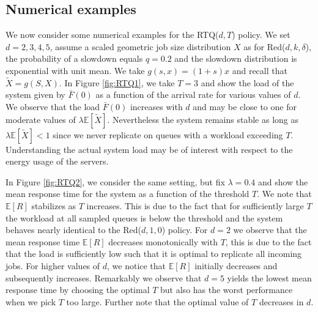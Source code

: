 \documentclass[12pt]{report}
\newcommand{\E}{\mathbb{E}}
\begin{document}
\subsection*{Numerical examples}

We now consider some numerical examples for the RTQ($d,T$) policy. We set $d=2,3,4,5$, assume
a scaled geometric job size distribution $X$ as for Red($d,k,\delta$), the probability of a slowdown equals $q=0.2$ and the slowdown distribution is exponential with unit mean. We take $g(s,x)=(1+s)x$ and recall that $\tilde{X}=g(S,X)$. In Figure \ref{fig:RTQ1}, we take $T=3$ and show the load of the system given by $\bar{F}(0)$ as a function of the arrival rate for various values of $d$. We observe that the load $\bar{F}(0)$ increases with $d$ and may be close to one for moderate values of $\lambda \E[\tilde X]$.
Nevertheless the system remains stable as long as $\lambda \E[\tilde X] < 1$ since we never replicate
on queues with a workload exceeding $T$. Understanding the actual system load may be of interest with
respect to the energy usage of the servers.

In Figure \ref{fig:RTQ2}, we consider the same setting, but fix $\lambda=0.4$ and show the mean response time for the system as a function of the threshold $T$. We note that $\E[R]$ stabilizes as $T$ increases. This is due to the fact that for sufficiently large $T$ the workload at all sampled queues is below the threshold and the system behaves nearly identical to the Red($d,1,0$) policy. For $d=2$ we observe that the mean response time $\E[R]$ decreases monotonically with $T$, this is due to the fact that the load is sufficiently low such that it is optimal to replicate all incoming jobs. For higher values of $d$, we notice that $\E[R]$ initially decreases and subsequently increases. Remarkably we observe that $d=5$ yields the lowest mean response time by choosing the optimal $T$ but also has the worst performance when we pick $T$ too large. Further note that the optimal value of $T$ decreases in $d$.
\end{document}

